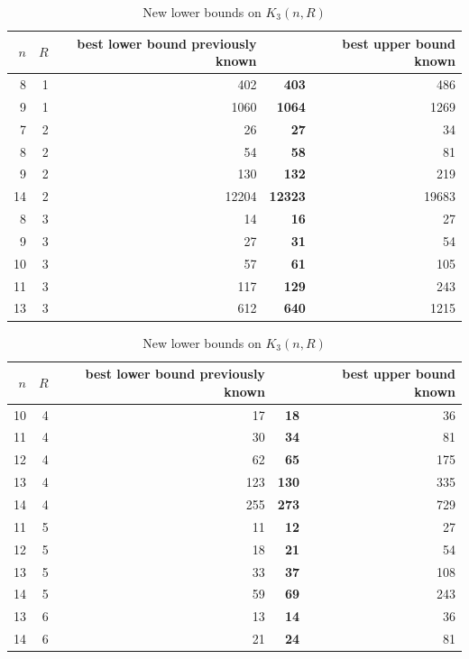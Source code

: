 \documentclass[10pt,a4paper]{article}
\theoremstyle{definition}
\begin{document}
\begin{table}[H] \small
\begin{center}
   \begin{minipage}[t]{.47\linewidth}\centering
    \begin{tabular}{| r | r|| r |>{\bfseries}r | r|}
    \hline
   $n$ & $R$ & \multicolumn{1}{b{14mm}|}{best lower bound previously known}  & \multicolumn{1}{b{11mm}|}{\textbf{new lower bound}} &  \multicolumn{1}{b{10mm}|}{best upper bound known}\\\hline 
       8 & 1   & 402 & 403 & 486  \\           
       9 & 1  & 1060 & 1064  & 1269   \\  \hline      
       7 & 2  & 26 & 27 & 34  \\           
       8 & 2  & 54 & 58 & 81  \\       
       9 & 2  & 130 & 132 & 219  \\           
       14& 2   & 12204 &12323  & 19683  \\  \hline     
       8& 3  & 14 & 16  & 27  \\           
       9 &3   &27  & 31 & 54  \\      
       10& 3  &57  & 61 & 105  \\       
       11& 3  & 117 & 129 & 243  \\           
       13& 3  & 612 & 640 & 1215   \\           
    \hline 
    \end{tabular}\end{minipage}    
   \begin{minipage}[t]{.47\linewidth}\centering
    \begin{tabular}{| r | r|| r |>{\bfseries}r | r|}
    \hline
   $n$ & $R$ & \multicolumn{1}{b{14mm}|}{best lower bound previously known}  & \multicolumn{1}{b{11mm}|}{\textbf{new lower bound}} &  \multicolumn{1}{b{10mm}|}{best upper bound known}\\\hline 
       10& 4  & 17  & 18 & 36  \\           
       11& 4  & 30 & 34 &  81 \\       
       12& 4  & 62 & 65 & 175  \\           
       13& 4  & 123 & 130 & 335  \\       
       14&4   & 255 & 273 & 729  \\\hline            
       11&5   & 11 &  12&  27 \\       
       12&5   & 18 &  21&  54 \\           
       13&5   &  33& 37 & 108  \\      
       14&5   & 59 & 69 & 243  \\ \hline      
       13&6   & 13 &  14 & 36  \\           
       14&6   & 21 & 24 & 81  \\         
    \hline 
    \end{tabular}\end{minipage}    
\end{center}
  \caption{New lower bounds on $K_3(n,R)$}
\end{table} 
\end{document}
